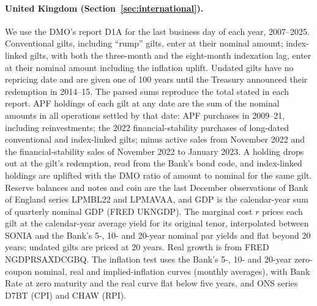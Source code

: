 \paragraph{United Kingdom (Section~\ref{sec:international}).} We use the DMO's report D1A for the last business day of each year, 2007--2025. Conventional gilts, including ``rump'' gilts, enter at their nominal amount; index-linked gilts, with both the three-month and the eight-month indexation lag, enter at their nominal amount including the inflation uplift. Undated gilts have no repricing date and are given one of 100 years until the Treasury announced their redemption in 2014--15. The parsed sums reproduce the total stated in each report. APF holdings of each gilt at any date are the sum of the nominal amounts in all operations settled by that date: APF purchases in 2009--21, including reinvestments; the 2022 financial-stability purchases of long-dated conventional and index-linked gilts; minus active sales from November 2022 and the financial-stability sales of November 2022 to January 2023. A holding drops out at the gilt's redemption, read from the Bank's bond code, and index-linked holdings are uplifted with the DMO ratio of amount to nominal for the same gilt. Reserve balances and notes and coin are the last December observations of Bank of England series LPMBL22 and LPMAVAA, and GDP is the calendar-year sum of quarterly nominal GDP (FRED UKNGDP). The marginal cost $r$ prices each gilt at the calendar-year average yield for its original tenor, interpolated between SONIA and the Bank's 5-, 10- and 20-year nominal par yields and flat beyond 20 years; undated gilts are priced at 20 years. Real growth is from FRED NGDPRSAXDCGBQ. The inflation test uses the Bank's 5-, 10- and 20-year zero-coupon nominal, real and implied-inflation curves (monthly averages), with Bank Rate at zero maturity and the real curve flat below five years, and ONS series D7BT (CPI) and CHAW (RPI).

